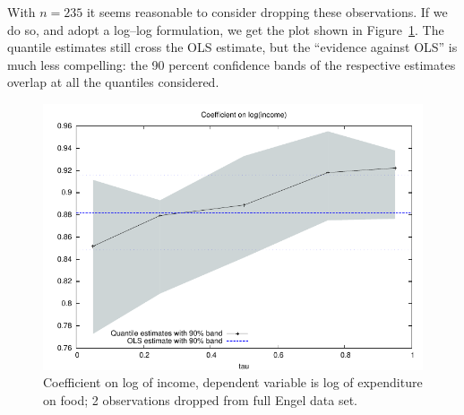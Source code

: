 With $n = 235$ it seems reasonable to consider dropping these
observations.  If we do so, and adopt a log--log formulation, we get
the plot shown in Figure~\ref{fig:tau2}.  The quantile estimates still
cross the OLS estimate, but the ``evidence against OLS'' is much less
compelling: the 90 percent confidence bands of the respective
estimates overlap at all the quantiles considered.

\begin{figure}
  \centering
  \includegraphics{figures/tau-sequence2}
  \caption{Coefficient on log of income, dependent variable is log of
    expenditure on food; 2 observations dropped from full Engel data
    set.}
  \label{fig:tau2}
\end{figure}






